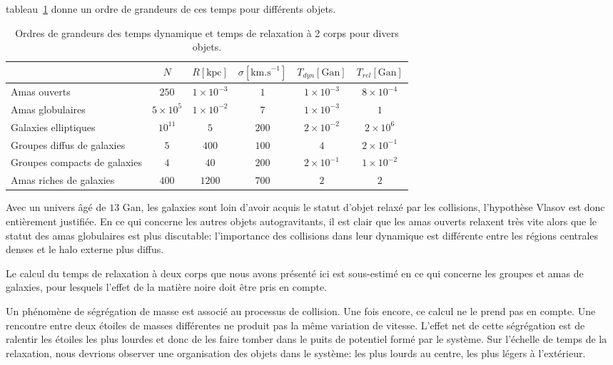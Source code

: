 tableau~\ref{Tab::TempsCarac::OG} donne un ordre de grandeurs de ces temps pour différents objets. %
\begin{table}[htbp]
	\centering \begin{tabular}[c]{l|c|c|c|c|c|}
		\cline{2-6} & $N$ & $R\left[  \text{kpc}\right]  $ & $\sigma\left[  \text{km.s}^{-1}\right]$ & $T_{dyn}\left[  \text{Gan}\right]  $ & $T_{rel}\left[\text{Gan}\right]$\\\hline
		\multicolumn{0}{|l|}{\small {Amas ouverts}} & $250$ & $1\times10^{-3}$ & $1$ & $1\times10^{-3}$ & $8\times10^{-4}$\\\hline
		\multicolumn{0}{|l|}{\small {Amas globulaires}} & $5\times10^{5}$ & $1\times10^{-2}$ & $7$ & $1\times10^{-3}$ & $1$\\\hline
		\multicolumn{0}{|l|}{\small {Galaxies elliptiques}} & $10^{11}$ & $5$ & $200$ & $2\times10^{-2}$ & $2\times10^{6}$\\\hline
		\multicolumn{0}{|l|}{\small {Groupes diffus de galaxies}} & $5$ & $400$ & $100$ & $4$ & $2\times 10^{-1}$\\\hline
		\multicolumn{0}{|l|}{\small {Groupes compacts de galaxies}} & $4$ & $40$ & $200$ & $2\times 10^{-1}$ & $1\times10^{-2}$\\\hline
		\multicolumn{0}{|l|}{\small {Amas riches de galaxies}} & $400$ & $1200$ & $700$ & $2$ & $2$\\\hline
	\end{tabular}
	\caption{Ordres de grandeurs des temps dynamique et temps de relaxation à 2 corps pour divers objets.\label{Tab::TempsCarac::OG}}
\end{table}
Avec un univers âgé de $13$ Gan, les galaxies sont loin d'avoir acquis le statut d'objet relaxé par les collisions, l'hypothèse Vlasov
est donc entièrement justifiée. En ce qui concerne les autres objets autogravitants, il est clair que les amas ouverts relaxent très vite alors que le
statut des amas globulaires est plus discutable: l'importance des collisions dans leur dynamique est différente entre les régions centrales denses et
le halo externe plus diffus.

Le calcul du temps de relaxation à deux corps que nous avons présenté ici est sous-estimé en ce qui concerne les groupes et amas de galaxies,
pour lesquels l'effet de la matière noire doit être pris en compte.

Un phénomène de ségrégation de masse est associé au processus de collision. Une fois encore, ce calcul ne le prend pas en compte. Une rencontre
entre deux étoiles de masses différentes ne produit pas la même variation de vitesse. L'effet net de cette ségrégation est de ralentir les étoiles
les plus lourdes et donc de les faire tomber dans le puits de potentiel formé par le système. Sur l'échelle de temps de la relaxation, nous devrions
observer une organisation des objets dans le système: les plus lourds au centre, les plus légers à l'extérieur.

